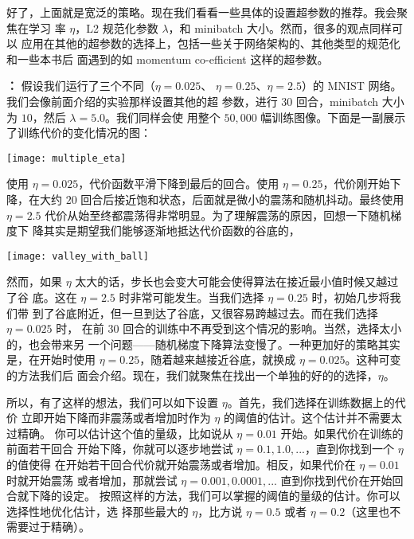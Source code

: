 好了，上面就是宽泛的策略。现在我们看看一些具体的设置超参数的推荐。我会聚焦在学习
率 $\eta$，L2 规范化参数 $\lambda$，和 minibatch 大小。然而，很多的观点同样可以
应用在其他的超参数的选择上，包括一些关于网络架构的、其他类型的规范化和一些本书后
面遇到的如 momentum co-efficient 这样的超参数。

\textbf{\learningrate{}：} 假设我们运行了三个不同\learningrate{}（$\eta=0.025$、
  $\eta=0.25$、$\eta=2.5$）的 MNIST 网络。我们会像前面介绍的实验那样设置其他的超
参数，进行 $30$ 回合，minibatch 大小为 $10$，然后 $\lambda = 5.0$。我们同样会使
用整个 $50,000$ 幅训练图像。下面是一副展示了训练代价的变化情况的图：
\begin{center}
  \texttt{[image: multiple\_eta]}
\end{center}

使用 $\eta=0.025$，代价函数平滑下降到最后的回合。使用 $\eta=0.25$，代价刚开始下
降，在大约 $20$ 回合后接近饱和状态，后面就是微小的震荡和随机抖动。最终使用
$\eta=2.5$ 代价从始至终都震荡得非常明显。为了理解震荡的原因，回想一下随机梯度下
降其实是期望我们能够逐渐地抵达代价函数的谷底的，
\begin{center}
  \texttt{[image: valley\_with\_ball]}
\end{center}

然而，如果 $\eta$ 太大的话，步长也会变大可能会使得算法在接近最小值时候又越过了谷
底。这在 $\eta=2.5$ 时非常可能发生。当我们选择 $\eta=0.25$ 时，初始几步将我们带
到了谷底附近，但一旦到达了谷底，又很容易跨越过去。而在我们选择 $\eta=0.025$ 时，
在前 $30$ 回合的训练中不再受到这个情况的影响。当然，选择太小的\learningrate{}，也会带来另
一个问题——随机梯度下降算法变慢了。一种更加好的策略其实是，在开始时使用
$\eta=0.25$，随着越来越接近谷底，就换成 $\eta=0.025$。这种可变\learningrate{}的方法我们后
面会介绍。现在，我们就聚焦在找出一个单独的好的\learningrate{}的选择，$\eta$。

所以，有了这样的想法，我们可以如下设置 $\eta$。首先，我们选择在训练数据上的代价
立即开始下降而非震荡或者增加时作为 $\eta$ 的阈值的估计。这个估计并不需要太过精确。
你可以估计这个值的量级，比如说从 $\eta=0.01$ 开始。如果代价在训练的前面若干回合
开始下降，你就可以逐步地尝试 $\eta=0.1, 1.0,...$，直到你找到一个 $\eta$ 的值使得
在开始若干回合代价就开始震荡或者增加。相反，如果代价在 $\eta=0.01$ 时就开始震荡
或者增加，那就尝试 $\eta=0.001, 0.0001,...$ 直到你找到代价在开始回合就下降的设定。
按照这样的方法，我们可以掌握\learningrate{}的阈值的量级的估计。你可以选择性地优化估计，选
择那些最大的 $\eta$，比方说 $\eta=0.5$ 或者 $\eta=0.2$（这里也不需要过于精确）。

